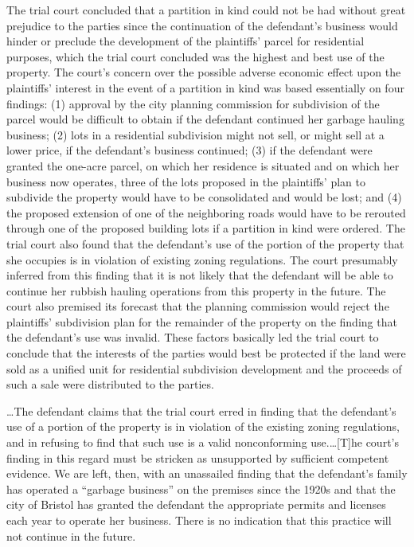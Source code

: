 The trial court concluded that a partition in kind could not be had without
great prejudice to the parties since the continuation of the defendant's
business would hinder or preclude the development of the plaintiffs' parcel for
residential purposes, which the trial court concluded was the highest and best
use of the property. The court's concern over the possible adverse economic
effect upon the plaintiffs' interest in the event of a partition in kind was
based essentially on four findings: (1) approval by the city planning
commission for subdivision of the parcel would be difficult to obtain if the
defendant continued her garbage hauling business; (2) lots in a residential
subdivision might not sell, or might sell at a lower price, if the defendant's
business continued; (3) if the defendant were granted the one-acre parcel, on
which her residence is situated and on which her business now operates, three
of the lots proposed in the plaintiffs' plan to subdivide the property would
have to be consolidated and would be lost; and (4) the proposed extension of
one of the neighboring roads would have to be rerouted through one of the
proposed building lots if a partition in kind were ordered. The trial court
also found that the defendant's use of the portion of the property that she
occupies is in violation of existing zoning regulations. The court presumably
inferred from this finding that it is not likely that the defendant will be
able to continue her rubbish hauling operations from this property in the
future. The court also premised its forecast that the planning commission would
reject the plaintiffs' subdivision plan for the remainder of the property on
the finding that the defendant's use was invalid. These factors basically led
the trial court to conclude that the interests of the parties would best be
protected if the land were sold as a unified unit for residential subdivision
development and the proceeds of such a sale were distributed to the parties.

\dots The defendant claims that the trial court erred in finding that the
defendant's use of a portion of the property is in violation of the existing
zoning regulations, and in refusing to find that such use is a valid
nonconforming use.\dots [T]he court's finding in this regard must be
stricken as unsupported by sufficient competent evidence. We are left, then,
with an unassailed finding that the defendant's family has operated a ``garbage
business'' on the premises since the 1920s and that the city of Bristol has
granted the defendant the appropriate permits and licenses each year to operate
her business. There is no indication that this practice will not continue in
the future.

